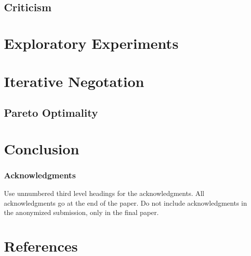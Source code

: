 \documentclass{article}
\begin{document}
\subsection{Criticism}%
\label{sub:criticism}

\section{Exploratory Experiments}%
\label{sec:exploratory_experiments}

\section{Iterative Negotation}%
\label{sec:iterative_negotation}

\subsection{Pareto Optimality}%
\label{sub:pareto_optimality}

\section{Conclusion}%
\label{sec:conclusion}

\subsubsection*{Acknowledgments}

Use unnumbered third level headings for the acknowledgments. All
acknowledgments go at the end of the paper. Do not include
acknowledgments in the anonymized submission, only in the final paper.

\section*{References}



\end{document}
